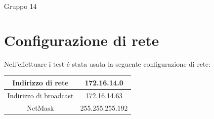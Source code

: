 \documentclass{exam}
\begin{document}
\newcommand{\LoggaEng}{
	\textsc{\Huge Uppsala University}\\[0.7cm]
	\texttt{[image: Uppsala\_University\_seal\_svg.png]}\\[0.5cm]
}


\begin{titlepage}

	\center


	\LoggaSwe



	\Large Gruppo 14\\



	\vfill

\end{titlepage}




\pagebreak
\section{Configurazione di rete}

Nell'effettuare i test é stata usata la seguente configurazione di rete:

\begin{table}[h!]
	\centering
	\begin{tabular}{|c|c|}
		\hline
		Indirizzo di rete      & 172.16.14.0     \\
		\hline
		Indirizzo di broadcast & 172.16.14.63    \\
		\hline
		NetMask                & 255.255.255.192 \\
		\hline
	\end{tabular}
	\label{tab:testbed}
\end{table}
\end{document}
